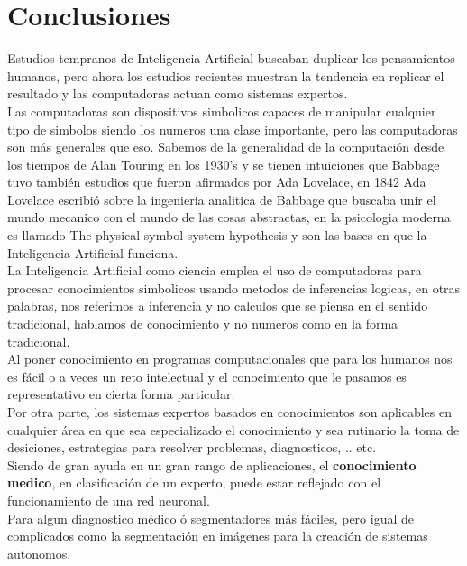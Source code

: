 \documentclass[a4paper, 11pt]{article}
\begin{document}
\newpage
\section{Conclusiones}

Estudios tempranos de Inteligencia Artificial buscaban duplicar los pensamientos humanos, pero ahora los estudios recientes muestran la tendencia en replicar el resultado y las computadoras actuan como sistemas expertos.\\

Las computadoras son dispositivos simbolicos capaces de manipular cualquier tipo de simbolos siendo los numeros una clase importante, pero las computadoras son más generales que eso. Sabemos de la generalidad de la computación desde los tiempos de Alan Touring en los 1930's y se tienen intuiciones que Babbage tuvo también estudios que fueron afirmados por Ada Lovelace, en 1842 Ada Lovelace escribió sobre la ingenieria analitica de Babbage que buscaba unir el mundo mecanico con el mundo de las cosas abstractas, en la psicologia moderna es llamado The physical symbol system hypothesis y son las bases en que la Inteligencia Artificial funciona.\\

La Inteligencia Artificial como ciencia emplea el uso de computadoras para procesar conocimientos simbolicos usando metodos de inferencias logicas, en otras palabras, nos referimos a inferencia y no calculos que se piensa en el sentido tradicional, hablamos de conocimiento y no numeros como en la forma tradicional.\\
Al poner conocimiento en programas computacionales que para los humanos nos es fácil o a veces un reto intelectual y el conocimiento que le pasamos es representativo en cierta forma particular.\\

Por otra parte, los sistemas expertos basados en conocimientos son aplicables en cualquier  área en que sea especializado el conocimiento y sea rutinario la toma de desiciones, estrategias para resolver problemas, diagnosticos, .. etc.\\
Siendo de gran ayuda en un gran rango de aplicaciones, el \textbf{conocimiento medico}, en clasificación de un experto, puede estar reflejado con el funcionamiento de una red neuronal.\\

Para algun diagnostico médico ó segmentadores más fáciles, pero igual de complicados como la segmentación en imágenes para la creación de sistemas autonomos.\\
\end{document}
